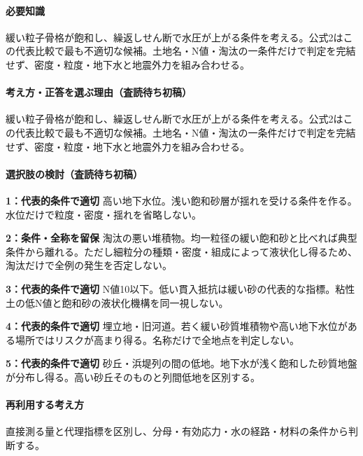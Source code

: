 \paragraph{必要知識} 緩い粒子骨格が飽和し、繰返しせん断で水圧が上がる条件を考える。公式2はこの代表比較で最も不適切な候補。土地名・N値・淘汰の一条件だけで判定を完結せず、密度・粒度・地下水と地震外力を組み合わせる。

\paragraph{考え方・正答を選ぶ理由（査読待ち初稿）} 緩い粒子骨格が飽和し、繰返しせん断で水圧が上がる条件を考える。公式2はこの代表比較で最も不適切な候補。土地名・N値・淘汰の一条件だけで判定を完結せず、密度・粒度・地下水と地震外力を組み合わせる。

\paragraph{選択肢の検討（査読待ち初稿）}\mbox{}\par

\noindent\textbf{1：代表的条件で適切} 高い地下水位。浅い飽和砂層が揺れを受ける条件を作る。水位だけで粒度・密度・揺れを省略しない。\par

\noindent\textbf{2：条件・全称を留保} 淘汰の悪い堆積物。均一粒径の緩い飽和砂と比べれば典型条件から離れる。ただし細粒分の種類・密度・組成によって液状化し得るため、淘汰だけで全例の発生を否定しない。\par

\noindent\textbf{3：代表的条件で適切} N値10以下。低い貫入抵抗は緩い砂の代表的な指標。粘性土の低N値と飽和砂の液状化機構を同一視しない。\par

\noindent\textbf{4：代表的条件で適切} 埋立地・旧河道。若く緩い砂質堆積物や高い地下水位がある場所ではリスクが高まり得る。名称だけで全地点を判定しない。\par

\noindent\textbf{5：代表的条件で適切} 砂丘・浜堤列の間の低地。地下水が浅く飽和した砂質地盤が分布し得る。高い砂丘そのものと列間低地を区別する。\par

\paragraph{再利用する考え方} 直接測る量と代理指標を区別し、分母・有効応力・水の経路・材料の条件から判断する。

